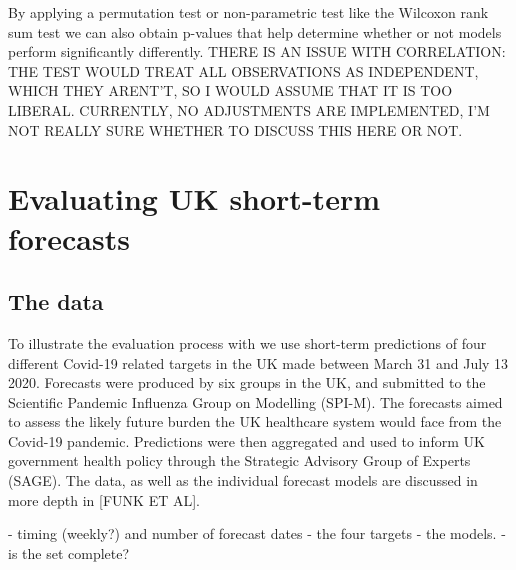 \documentclass[article]{jss}
\begin{document}
By applying a permutation test or non-parametric test like the Wilcoxon rank sum test we can also obtain p-values that help determine whether or not models perform significantly differently. THERE IS AN ISSUE WITH CORRELATION: THE TEST WOULD TREAT ALL OBSERVATIONS AS INDEPENDENT, WHICH THEY ARENT'T, SO I WOULD ASSUME THAT IT IS TOO LIBERAL. CURRENTLY, NO ADJUSTMENTS ARE IMPLEMENTED, I'M NOT REALLY SURE WHETHER TO DISCUSS THIS HERE OR NOT. 


\section{Evaluating UK short-term forecasts}
\subsection{The data}

To illustrate the evaluation process with  we use short-term predictions of four different Covid-19 related targets in the UK made between March 31 and July 13 2020. Forecasts were produced by six groups in the UK, and submitted to the Scientific Pandemic Influenza Group on Modelling (SPI-M). The forecasts aimed to assess the likely future burden the UK healthcare system would face from the Covid-19 pandemic. Predictions were then aggregated and used to inform UK government health policy through the Strategic Advisory Group of Experts (SAGE). The data, as well as the individual forecast models are discussed in more depth in [FUNK ET AL]. 

- timing (weekly?) and number of forecast dates
- the four targets
- the models. 
- is the set complete?
\end{document}
